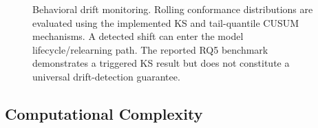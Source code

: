 \documentclass[11pt,a4paper]{article}
\begin{document}
\begin{figure}[!htbp]

\caption{Behavioral drift monitoring. Rolling conformance distributions are evaluated
using the implemented KS and tail-quantile CUSUM mechanisms. A detected shift can enter
the model lifecycle/relearning path. The reported RQ5 benchmark demonstrates a triggered
KS result but does not constitute a universal drift-detection guarantee.}
\label{fig:drift}

\end{figure}

\subsection{Computational Complexity}
\end{document}
